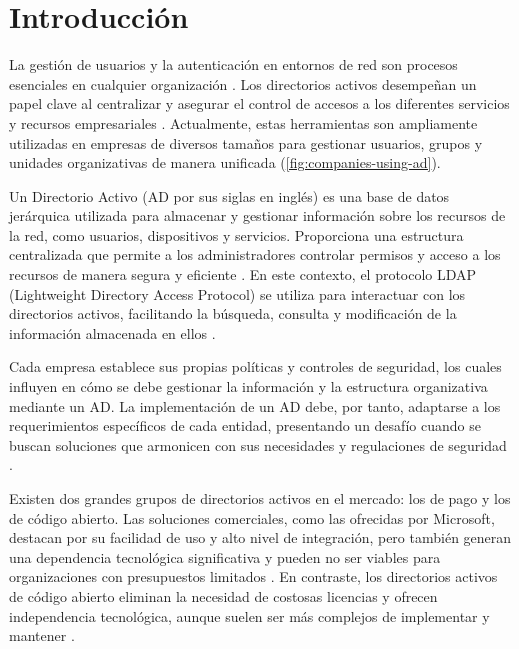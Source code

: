 \section{Introducción}

La gestión de usuarios y la autenticación en entornos de red son procesos esenciales en cualquier organización \autocite{thakur_user_2015-1, josang_local_2015, kizza_access_2024}. Los directorios activos desempeñan un papel clave al centralizar y asegurar el control de accesos a los diferentes servicios y recursos empresariales \autocite{kizza_access_2024}. Actualmente, estas herramientas son ampliamente utilizadas en empresas de diversos tamaños para gestionar usuarios, grupos y unidades organizativas de manera unificada (\autoref{fig:companies-using-ad}).

Un Directorio Activo (AD por sus siglas en inglés) es una base de datos jerárquica utilizada para almacenar y gestionar información sobre los recursos de la red, como usuarios, dispositivos y servicios. Proporciona una estructura centralizada que permite a los administradores controlar permisos y acceso a los recursos de manera segura y eficiente  \autocite{harrison_lightweight_2006,thakur_user_2015,carter_ldap_2003}. En este contexto, el protocolo LDAP (Lightweight Directory Access Protocol) se utiliza para interactuar con los directorios activos, facilitando la búsqueda, consulta y modificación de la información almacenada en ellos \autocite{harrison_lightweight_2006,sermersheim_lightweight_2006,bartlett_samba_2005,voglmaier_abcs_2003,redhat_what_2022,janice_ldap_2023}.

Cada empresa establece sus propias políticas y controles de seguridad, los cuales influyen en cómo se debe gestionar la información y la estructura organizativa mediante un AD. La implementación de un AD debe, por tanto, adaptarse a los requerimientos específicos de cada entidad, presentando un desafío cuando se buscan soluciones que armonicen con sus necesidades y regulaciones de seguridad \autocite{kizza_access_2024,harrison_lightweight_2006,thakur_user_2015}.

Existen dos grandes grupos de directorios activos en el mercado: los de pago y los de código abierto. Las soluciones comerciales, como las ofrecidas por Microsoft, destacan por su facilidad de uso y alto nivel de integración, pero también generan una dependencia tecnológica significativa y pueden no ser viables para organizaciones con presupuestos limitados . En contraste, los directorios activos de código abierto eliminan la necesidad de costosas licencias y ofrecen independencia tecnológica, aunque suelen ser más complejos de implementar y mantener \autocite{thakur_user_2015-1,bartlett_samba_2005,imanudin_active_2019}.

